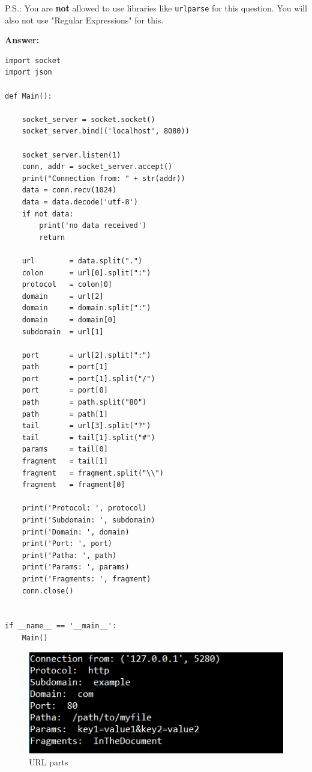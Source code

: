 \documentclass{WeSTassignment}
\begin{document}
P.S.: You are \textbf{not} allowed to use libraries like \texttt{urlparse} for this question. You will also not use "Regular Expressions" for this. 

\textbf{Answer:} 

\begin{lstlisting}
import socket
import json

def Main():

    socket_server = socket.socket()
    socket_server.bind(('localhost', 8080))

    socket_server.listen(1)
    conn, addr = socket_server.accept()
    print("Connection from: " + str(addr))
    data = conn.recv(1024)
    data = data.decode('utf-8')
    if not data:
        print('no data received')
        return

    url        = data.split(".")
    colon      = url[0].split(":")
    protocol   = colon[0]
    domain     = url[2]
    domain     = domain.split(":")
    domain     = domain[0]
    subdomain  = url[1]

    port       = url[2].split(":")
    path       = port[1]
    port       = port[1].split("/")
    port       = port[0]
    path       = path.split("80")
    path       = path[1]
    tail       = url[3].split("?")
    tail       = tail[1].split("#")
    params     = tail[0]
    fragment   = tail[1]
    fragment   = fragment.split("\\")
    fragment   = fragment[0]

    print('Protocol: ', protocol)
    print('Subdomain: ', subdomain)
    print('Domain: ', domain)
    print('Port: ', port)
    print('Patha: ', path)
    print('Params: ', params)
    print('Fragments: ', fragment)
    conn.close()


if __name__ == '__main__':
    Main()
\end{lstlisting}
\begin{figure}[h]
  \centering
  \includegraphics{splitting_url.png}
   \caption{URL parts}
     \label{fig:dig} 
\end{figure}
\end{document}
